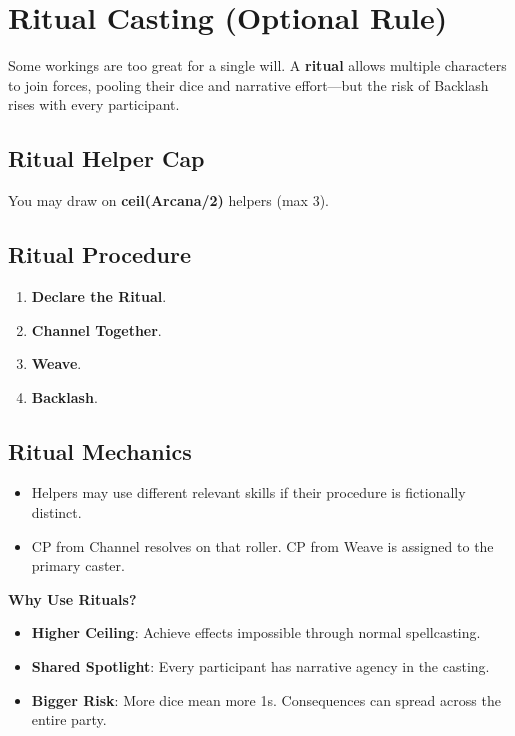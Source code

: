 \section*{Ritual Casting (Optional Rule)}

Some workings are too great for a single will. A \textbf{ritual} allows multiple characters to join forces, pooling their dice and narrative effort---but the risk of Backlash rises with every participant.

\subsection*{Ritual Helper Cap}

You may draw on \textbf{ceil(Arcana/2)} helpers (max 3).

\subsection*{Ritual Procedure}

\begin{enumerate}
    \item \textbf{Declare the Ritual}.
    \item \textbf{Channel Together}.
    \item \textbf{Weave}.
    \item \textbf{Backlash}.
\end{enumerate}

\subsection*{Ritual Mechanics}

\begin{itemize}
    \item Helpers may use different relevant skills if their procedure is fictionally distinct.
    \item CP from Channel resolves on that roller. CP from Weave is assigned to the primary caster.
\end{itemize}

\textbf{Why Use Rituals?}

\begin{itemize}
    \item \textbf{Higher Ceiling}: Achieve effects impossible through normal spellcasting.
    \item \textbf{Shared Spotlight}: Every participant has narrative agency in the casting.
    \item \textbf{Bigger Risk}: More dice mean more 1s. Consequences can spread across the entire party.
\end{itemize}

